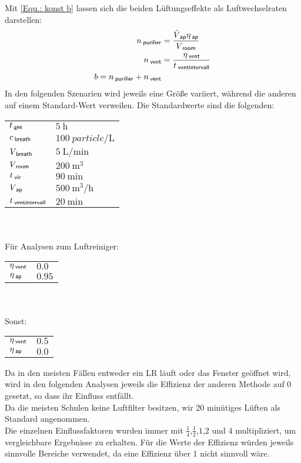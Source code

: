 \documentclass[12pt,a4paper,bibtotocnumbered,liststotocnumbered]{scrreprt}
\begin{document}
Mit \autoref{Equ.: konst b} lassen sich die beiden Lüftungseffekte als Luftwechselraten darstellen:
\begin{align}
n_{\: \mathsf{purifier}} &= \frac{\dot{V}_{\: \mathsf{ap}} \eta_{\: \mathsf{ap}}}{V_{\: \mathsf{room}}}\\
n_{\: \mathsf{vent}} &= \frac{ \eta_{\: \mathsf{vent}} }{t_{\: \mathsf{ventintervall}}}\\
b = n_{\: \mathsf{purifier}} + n_{\: \mathsf{vent}}
\end{align}
In den folgenden Szenarien wird jeweils eine Größe variiert, während die anderen auf einem Standard-Wert verweilen. Die Standardwerte sind die folgenden:\\
\begin{tabular}{ll}
$t_{\: \mathsf{ges}}$ & $\SI{5}{\hour}$   \\
$c_{\: \mathsf{breath}}$ & $\SI{100}{particle\per\liter}$ \\   
$V_{\: \mathsf{breath}}$ & $\SI{5}{\liter\per\minute}$   \\
$V_{\: \mathsf{room}}$ & $\SI{200}{\cubic\meter}$   \\
$t_{\: \mathsf{vir}}$ & $\SI{90}{\minute}$\\
$V_{\: \mathsf{ap}}$ & $\SI{500}{\cubic\meter\per\hour}$   \\
$t_{\: \mathsf{ventintervall}}$ & $\SI{20}{\minute}$    \\
\end{tabular}
\\ \\
Für Analysen zum Luftreiniger:\\
\begin{tabular}{ll}
$\eta_{\: \mathsf{vent}}$ & $0.0$ \\
$\eta_{\: \mathsf{ap}}$ & $0.95$    \\
\end{tabular}
\\ \\
Sonst:\\
\begin{tabular}{ll}
$\eta_{\: \mathsf{vent}}$ & $0.5$ \\
$\eta_{\: \mathsf{ap}}$ & $0.0$    \\
\end{tabular}

Da in den meisten Fällen entweder ein \ac{LR} läuft oder das Fenster geöffnet wird, wird in den folgenden Analysen jeweils die Effizienz der anderen Methode auf 0 gesetzt, so dass ihr Einfluss entfällt.\\
Da die meisten Schulen keine Luftfilter besitzen, wir 20 minütiges Lüften als Standard angenommen.\\
Die einzelnen Einflussfaktoren wurden immer mit $\frac{1}{4}$,$\frac{1}{2}$,$1$,$2$ und $4$ multipliziert, um vergleichbare Ergebnisse zu erhalten. Für die Werte der Effizienz würden jeweils sinnvolle Bereiche verwendet, da eine Effizienz über 1 nicht sinnvoll wäre.\\
\end{document}

